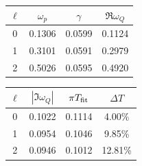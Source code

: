 \documentclass[UTF8,fontset=fandol,11pt,a4paper,oneside]{ctexart}
\numberwithin{equation}{section}
\begin{document}
\noindent\begin{minipage}{\linewidth}
\captionsetup{type=table}\caption{轴对称共振峰、QNM 比较及描述性宽度。}\label{audit:tab:fit}
\centering\fontsize{10}{13.5}\selectfont
\setlength{\tabcolsep}{6pt}\renewcommand{\arraystretch}{1.2}
\par{}\par\smallskip
\begin{tabular}{cccc}\toprule
$\ell$ & $\omega_p$ & $\gamma$ & $\Re\omega_Q$\\\midrule
0 & 0.1306 & 0.0599 & 0.1124\\
1 & 0.3101 & 0.0591 & 0.2979\\
2 & 0.5026 & 0.0595 & 0.4920\\
\bottomrule\end{tabular}
\par\medskip
\par{}\par\smallskip
\begin{tabular}{cccc}\toprule
$\ell$ & $|\Im\omega_Q|$ & $\pi T_{\rm fit}$ & $\Delta T$\\\midrule
0 & 0.1022 & 0.1114 & 4.00\%\\
1 & 0.0954 & 0.1046 & 9.85\%\\
2 & 0.0946 & 0.1012 & 12.81\%\\
\bottomrule\end{tabular}
\end{minipage}\par\addvspace{10pt}
\par\addvspace{14pt}
\end{document}
